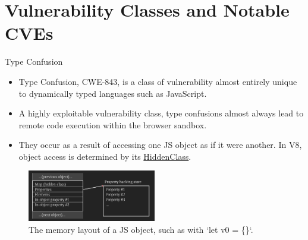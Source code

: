 \section{Vulnerability Classes and Notable CVEs}
\frame{\sectionpage}

\begin{frame}{Type Confusion}
    \begin{itemize}
        \item Type Confusion, CWE-843, is a class of vulnerability almost entirely unique to dynamically typed languages such as JavaScript.
        \item A highly exploitable vulnerability class, type confusions almost always lead to remote code execution within the browser sandbox.
        \item They occur as a result of accessing one JS object as if it were another. In V8, object access is determined by its \href{https://v8.dev/docs/hidden-classes}{\color{pink}HiddenClass}.
    \end{itemize}
    \begin{center}
        \begin{figure}
            \centering
            \includegraphics[width=0.5\textwidth]{images/v8-js-object.png}   
            \caption{The memory layout of a JS object, such as with `let v0 = \{\}`.}
            \label{fig:v8-js-object}
        \end{figure}
    \end{center}
\end{frame}

